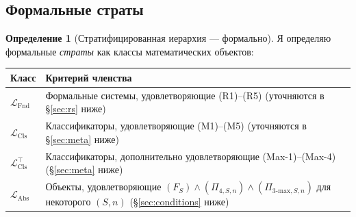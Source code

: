 \documentclass[11pt]{article}
\theoremstyle{plain}
\theoremstyle{definition}
\newtheorem{definition}[theorem]{Определение}
\newcommand{\LFnd}{\mathcal{L}_{\mathrm{Fnd}}}
\newcommand{\LCls}{\mathcal{L}_{\mathrm{Cls}}}
\newcommand{\LClsMax}{\mathcal{L}_{\mathrm{Cls}}^{\top}}
\newcommand{\LAbs}{\mathcal{L}_{\mathrm{Abs}}}
\begin{document}
\subsection{Формальные страты}

\begin{definition}[Стратифицированная иерархия --- формально]\label{def:hierarchy}
Я определяю формальные \emph{страты} как классы математических объектов:

\begin{tabular}{@{}ll@{}}
\toprule
Класс & Критерий членства \\ \midrule
$\LFnd$ & Формальные системы, удовлетворяющие (R1)--(R5) (уточняются в \S\ref{sec:rs} ниже) \\
$\LCls$ & Классификаторы, удовлетворяющие (M1)--(M5) (уточняются в \S\ref{sec:meta} ниже) \\
$\LClsMax$ & Классификаторы, дополнительно удовлетворяющие (Max-1)--(Max-4) (\S\ref{sec:meta} ниже) \\
$\LAbs$ & Объекты, удовлетворяющие $(F_S) \wedge (\Pi_{4, S, n}) \wedge (\Pi_{3\text{-max}, S, n})$ для некоторого $(S, n)$ (\S\ref{sec:conditions} ниже) \\
\bottomrule
\end{tabular}
\end{definition}
\end{document}
